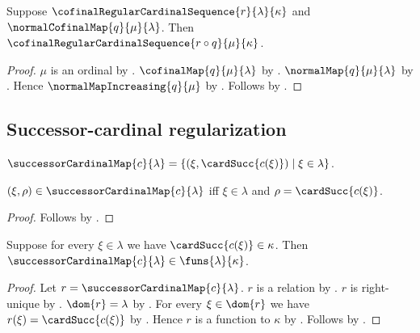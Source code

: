 \begin{corollary}\label{cofinal_regular_sequence_normal_reindex}
    Suppose $\cofinalRegularCardinalSequence{r}{\lambda}{\kappa}$ and
        $\normalCofinalMap{q}{\mu}{\lambda}$.
    Then
        $\cofinalRegularCardinalSequence{r\circ q}{\mu}{\kappa}$.
\end{corollary}
\begin{proof}
    $\mu$ is an ordinal by .
    $\cofinalMap{q}{\mu}{\lambda}$ by
        .
    $\normalMap{q}{\mu}{\lambda}$ by
        .
    Hence $\normalMapIncreasing{q}{\mu}$ by .
    Follows by .
\end{proof}

\subsection{Successor-cardinal regularization}

\begin{definition}\label{successor_cardinal_map}
    $\successorCardinalMap{c}{\lambda}
        =\{(\xi,\cardSucc{c(\xi)})\mid\xi\in\lambda\}$.
\end{definition}

\begin{proposition}\label{successor_cardinal_map_iff}
    $(\xi,\rho)\in\successorCardinalMap{c}{\lambda}$ iff
        $\xi\in\lambda$ and $\rho=\cardSucc{c(\xi)}$.
\end{proposition}
\begin{proof}
    Follows by .
\end{proof}

\begin{theorem}\label{successor_cardinal_map_type}
    Suppose for every $\xi\in\lambda$ we have
        $\cardSucc{c(\xi)}\in\kappa$.
    Then $\successorCardinalMap{c}{\lambda}
        \in\funs{\lambda}{\kappa}$.
\end{theorem}
\begin{proof}
    Let $r=\successorCardinalMap{c}{\lambda}$.
    $r$ is a relation by
        .
    $r$ is right-unique by
        .
    $\dom{r}=\lambda$ by
        .
    For every $\xi\in\dom{r}$ we have
        $r(\xi)=\cardSucc{c(\xi)}$ by
        .
    Hence $r$ is a function to $\kappa$ by \auto.
    Follows by .
\end{proof}

